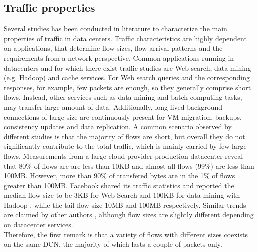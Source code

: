\subsection{Traffic properties}
\label{sec:traffic-properties}
Several studies has been conducted in literature to characterize the main properties of traffic in data centers. Traffic characteristics are highly dependent on applications, that determine flow sizes, flow arrival patterns and the requirements from a network perspective. Common applications running in datacenters and for which there exist traffic studies are Web search, data mining (e.g. Hadoop) and cache services. For Web search queries and the corresponding responses, for example, few packets are enough, so they generally comprise short flows. Instead, other services such as data mining and batch computing tasks, may transfer large amount of data. Additionally, long-lived background connections of large size are continuously present for VM migration, backups, consistency updates and data replication. A common scenario observed by different studies is that the majority of flows are short, but overall they do not significantly contribute to the total traffic, which is mainly carried by few large flows. Measurements from a large cloud provider production datacenter reveal that 80\% of flows are are less than 10KB and almost all flows (99\%) are less than 100MB. However, more than 90\% of transfered bytes are in the 1\% of flows greater than 100MB.  Facebook \cite{facebook_dcn} shared its traffic statistics and reported the median flow size to be 3KB for Web Search and 100KB for data mining with Hadoop \cite{hadoop}, while the tail flow size 10MB and 100MB respectively. Similar trends are claimed by other authors \cite{net-traffic-characteristics-benson, pFabric, dctcp}, although flow sizes are slightly different depending on datacenter services. \\ 
Therefore, the first remark is that a variety of flows with different sizes coexists on the same DCN, the majority of which lasts a couple of packets only. 

